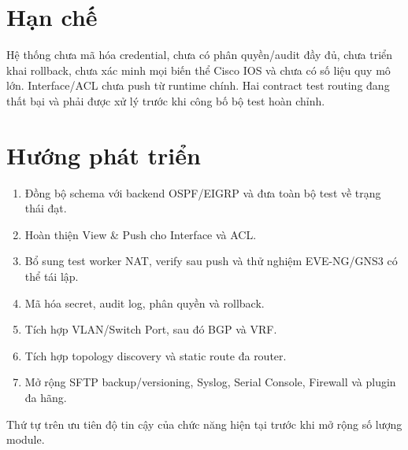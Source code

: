 \section{Hạn chế}

Hệ thống chưa mã hóa credential, chưa có phân quyền/audit đầy đủ, chưa triển khai rollback, chưa xác minh mọi biến thể Cisco IOS và chưa có số liệu quy mô lớn. Interface/ACL chưa push từ runtime chính. Hai contract test routing đang thất bại và phải được xử lý trước khi công bố bộ test hoàn chỉnh.

\section{Hướng phát triển}

\begin{enumerate}
  \item Đồng bộ schema với backend OSPF/EIGRP và đưa toàn bộ test về trạng thái đạt.
  \item Hoàn thiện View \& Push cho Interface và ACL.
  \item Bổ sung test worker NAT, verify sau push và thử nghiệm EVE-NG/GNS3 có thể tái lập.
  \item Mã hóa secret, audit log, phân quyền và rollback.
  \item Tích hợp VLAN/Switch Port, sau đó BGP và VRF.
  \item Tích hợp topology discovery và static route đa router.
  \item Mở rộng SFTP backup/versioning, Syslog, Serial Console, Firewall và plugin đa hãng.
\end{enumerate}

Thứ tự trên ưu tiên độ tin cậy của chức năng hiện tại trước khi mở rộng số lượng module.
